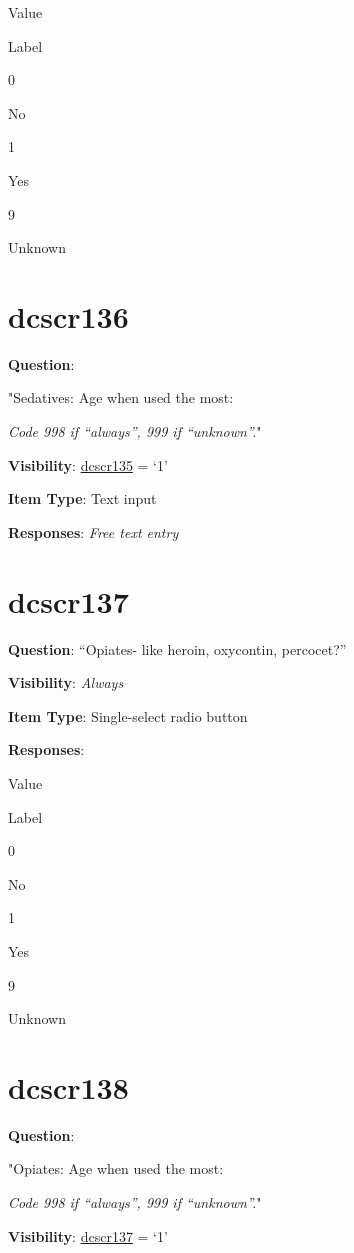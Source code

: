 \documentclass[]{book}
\begin{document}
Value

Label

0

No

1

Yes

9

Unknown

\hypertarget{dcscr136}{%
\section{dcscr136}\label{dcscr136}}

\textbf{Question}:

"Sedatives: Age when used the most:

\emph{Code 998 if ``always'', 999 if ``unknown''.}"

\textbf{Visibility}: \protect\hyperlink{dcscr135}{dcscr135} = `1'

\textbf{Item Type}: Text input

\textbf{Responses}: \emph{Free text entry}

\hypertarget{dcscr137}{%
\section{dcscr137}\label{dcscr137}}

\textbf{Question}: ``Opiates- like heroin, oxycontin, percocet?''

\textbf{Visibility}: \emph{Always}

\textbf{Item Type}: Single-select radio button

\textbf{Responses}:

Value

Label

0

No

1

Yes

9

Unknown

\hypertarget{dcscr138}{%
\section{dcscr138}\label{dcscr138}}

\textbf{Question}:

"Opiates: Age when used the most:

\emph{Code 998 if ``always'', 999 if ``unknown''.}"

\textbf{Visibility}: \protect\hyperlink{dcscr137}{dcscr137} = `1'
\end{document}
